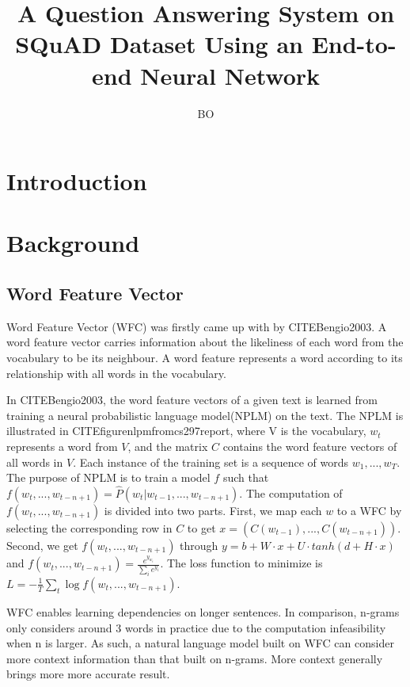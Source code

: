 \documentclass[modernstyle,12pt]{sjsuthesis}
\title{A Question Answering System on SQuAD Dataset Using an End-to-end Neural Network}
\author{BO}{LI}
\theoremstyle{definition}
\begin{document}
\raggedright          %
\parindent=30pt       %




\chapter{Introduction}
\chapter{Background}
\section{Word Feature Vector}
Word Feature Vector (WFC) was firstly came up with by CITEBengio2003. A word feature vector carries information about the likeliness of each word from the vocabulary to be its neighbour. A word feature represents a word according to its relationship with all words in the vocabulary.

In CITEBengio2003, the word feature vectors of a given text is learned from training a neural probabilistic language model(NPLM) on the text. The NPLM is illustrated in CITEfigurenlpmfromcs297report, where V is the vocabulary, $w_t$ represents a word from $V$, and the matrix $C$ contains the word feature vectors of all words in $V$. Each instance of the training set is a sequence of words $w_1,...,w_T$. The purpose of NPLM is to train a model $f$ such that $ f(w_t, ..., w_{t-n+1}) = \hat{P}(w_t | w_{t-1},...,w_{t-n+1})$. The computation of $f(w_t, ..., w_{t-n+1})$ is divided into two parts.
First, we map each $w$ to a WFC by selecting the corresponding row in $C$ to get $x=(C(w_{t-1}),... ,C(w_{t-n+1}))$. Second, we get $f(w_t, ..., w_{t-n+1})$ through $y=b+W\cdot x + U\cdot tanh(d + H\cdot x)$ and $ f(w_t, ..., w_{t-n+1}) = \frac{e^{y_{w_t}}}{\sum_{i}^{}e^{y_i}}$. The loss function to minimize is $L = -\frac{1}{T}\sum _{t}^{} \log{f(w_t, ..., w_{t-n+1})}$.


WFC enables learning dependencies on longer sentences. In comparison, n-grams only considers around 3 words in practice due to the computation infeasibility when n is larger. As such, a natural language model built on WFC can consider more context information than that built on n-grams. More context generally brings more more accurate result.
\end{document}
